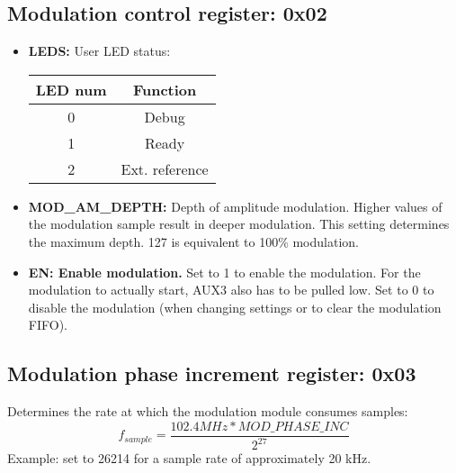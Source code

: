 \documentclass{article}
\newcommand{\bitrect}[2]{
  \begin{pgfonlayer}{foreground}
    \draw [thick] (0,0) rectangle (#1,1);
    \pgfmathsetmacro\result{#1-1}
    \foreach \x in {1,...,\result}
      \draw [thick] (\x,1) -- (\x, 0.8);
  \end{pgfonlayer}
  \bitlabels{#1}{#2}
}
\newcommand{\rwbits}[3]{
  \draw [thick] (#1,0) rectangle ++(#2,1) node[pos=0.5]{#3};
  \pgfmathsetmacro\start{#1+0.5}
  \pgfmathsetmacro\finish{#1+#2-0.5}
}
\newcommand{\robits}[3]{
  \begin{pgfonlayer}{background}
    \draw [thick, fill=lightgray] (#1,0) rectangle ++(#2,1) node[pos=0.5]{#3};
  \end{pgfonlayer}
  \pgfmathsetmacro\start{#1+0.5}
  \pgfmathsetmacro\finish{#1+#2-0.5}
}
\newcommand{\bitlabels}[2]{
  \foreach \bit in {1,...,#1}{
     \pgfmathsetmacro\result{#2}
     \node [above] at (\bit-0.5, 1) {\pgfmathprintnumber{\result}};
   }
}
\begin{document}
\subsection{Modulation control register: 0x02}
\begin{center}
\end{center}
\begin{itemize}
\item \textbf{LEDS:} User LED status:
\begin{center}
\begin{tabular}{ c|c }
LED num & Function\\
 \hline
0 & Debug\\
1 & Ready\\
2 & Ext. reference\\
\end{tabular}
\end{center}
\item \textbf{MOD\_AM\_DEPTH:} Depth of amplitude modulation. Higher values of the modulation sample result in deeper modulation. This setting determines the maximum depth. 127 is equivalent to 100\% modulation.
\item \textbf{EN: Enable modulation.} Set to 1 to enable the modulation. For the modulation to actually start, AUX3 also has to be pulled low. Set to 0 to disable the modulation (when changing settings or to clear the modulation FIFO).
\end{itemize}

\subsection{Modulation phase increment register: 0x03}
\begin{center}
\end{center}

Determines the rate at which the modulation module consumes samples:
$$
f_{sample} = \frac{102.4 MHz * MOD\_PHASE\_INC}{2^{27}}
$$
Example: set to 26214 for a sample rate of approximately 20 kHz.
\end{document}
